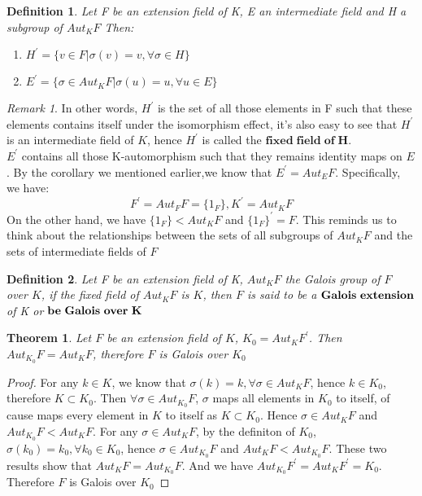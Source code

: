 \documentclass[a4paper, 11pt]{article}
\newtheorem{difinition}{Definition}
\newtheorem{theorem}{Theorem}
\theoremstyle{remark}
\newtheorem*{remark}{Remark}
\theoremstyle{definition}
\begin{document}
    \vspace{0.5cm}
    \begin{difinition}
            Let F be an extension field of K, E an intermediate field and H a subgroup of 
            $Aut_K F$ Then:
            \begin{enumerate}
                    \item $H^{'}=\{v\in F | \sigma(v)=v, \forall \sigma \in H\}$
                    \item $E^{'}=\{\sigma\in Aut_K F | \sigma(u)=u, \forall u\in E\} $
            \end{enumerate}
    \end{difinition}
    \vspace{0.3cm}
    \begin{remark}
        In other words, $H^{'}$ is the set of all those elements in F such that these 
        elements contains itself under the isomorphism effect, it's also easy to see that $H^{'}$ is an intermediate field of $K$, hence $H^{'}$ is called the 
        $\mathbf{fixed\; field\; of\; H}$.\\
        \indent $E^{'}$ contains all those K-automorphism such that they remains identity 
        maps on $E$. By the corollary we mentioned earlier,we know that $E^{'}=Aut_E F$.
        Specifically, we have:
        $$
        F^{'}=Aut_{F}F=\{1_F\}, K^{'}=Aut_{K}F
        $$ On the other hand, we have $\{1_F\} < Aut_{K}F$ and $\{1_F\}^{'}=F$. This 
        reminds us to think about the relationships between the sets of all subgroups of 
        $Aut_K F$ and the sets of intermediate fields of $F$
    \end{remark}
    \vspace{0.5cm}
    \begin{difinition}
            Let F be an extension field of K, $Aut_K F$ the Galois group of $F$ over $K$,
            if the fixed field of $Aut_{K}F$ is $K$, then $F$ is said to be a $\textbf{Galois\;extension}$ of K or $\textbf{be\;Galois\;over\;K}$
            
    \end{difinition}
    \vspace{0.5cm}
    \begin{theorem}
            Let $F$ be an extension field of $K$, $K_0=Aut_K F^{'}$. Then $Aut_{K_0}F=Aut_{K} F$, therefore $F$ is Galois over $K_0$
    \end{theorem}
    \vspace{0.3cm}
    \begin{proof}
        For any $k\in K$, we know that $\sigma(k)=k,\forall \sigma\in Aut_{K}F$, hence 
        $k\in K_0$, therefore $K\subset K_0$. Then $\forall \sigma \in Aut_{K_0}F$, $\sigma$
        maps all elements in $K_0$ to itself, of cause maps every element in $K$ to itself
        as $K\subset K_0$. Hence $\sigma \in Aut_{K}F$ and $Aut_{K_0}F<Aut_{K}F$. For 
        any $\sigma \in Aut_{K}F$, by the definiton of $K_0$, $\sigma(k_0)=k_0,\forall k_0 \in K_0$, hence $\sigma\in Aut_{K_0}F$ and $Aut_{K}F<Aut_{K_0}F$. These two results show
        that $Aut_{K}F=Aut_{K_0}F$. And we have $Aut_{K_0}F^{'}=Aut_{K}F^{'}=K_0$. 
        Therefore $F$ is Galois over $K_0$
    \end{proof}
    
\end{document}
